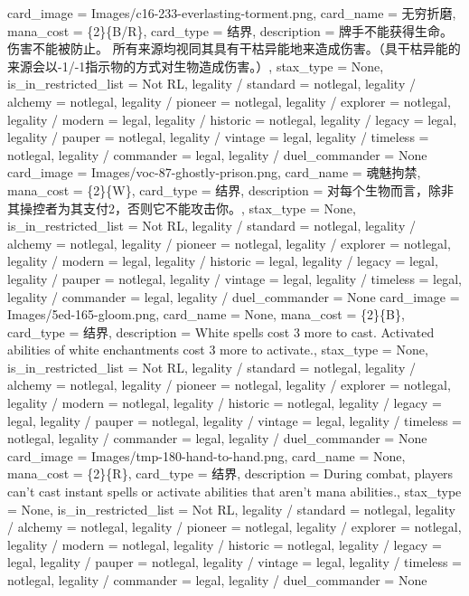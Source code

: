 \documentclass[lang = cn, color = black, 10pt]{AllThatStax}
\begin{document}
\card
{
	card_image = Images/c16-233-everlasting-torment.png,
	card_name = 无穷折磨,
	mana_cost = \{2\}\{B/R\},
	card_type = 结界,
	description = 牌手不能获得生命。
	伤害不能被防止。
	所有来源均视同其具有干枯异能地来造成伤害。（具干枯异能的来源会以-1/-1指示物的方式对生物造成伤害。）,
	stax_type = None,
	is_in_restricted_list = Not RL,
	legality / standard = notlegal,
	legality / alchemy = notlegal,
	legality / pioneer = notlegal,
	legality / explorer = notlegal,
	legality / modern = legal,
	legality / historic = notlegal,
	legality / legacy = legal,
	legality / pauper = notlegal,
	legality / vintage = legal,
	legality / timeless = notlegal,
	legality / commander = legal,
	legality / duel_commander = None
}
\card
{
	card_image = Images/voc-87-ghostly-prison.png,
	card_name = 魂魅拘禁,
	mana_cost = \{2\}\{W\},
	card_type = 结界,
	description = 对每个生物而言，除非其操控者为其支付{2}，否则它不能攻击你。,
	stax_type = None,
	is_in_restricted_list = Not RL,
	legality / standard = notlegal,
	legality / alchemy = notlegal,
	legality / pioneer = notlegal,
	legality / explorer = notlegal,
	legality / modern = legal,
	legality / historic = legal,
	legality / legacy = legal,
	legality / pauper = notlegal,
	legality / vintage = legal,
	legality / timeless = legal,
	legality / commander = legal,
	legality / duel_commander = None
}
\card
{
	card_image = Images/5ed-165-gloom.png,
	card_name = None,
	mana_cost = \{2\}\{B\},
	card_type = 结界,
	description = White spells cost {3} more to cast.
	Activated abilities of white enchantments cost {3} more to activate.,
	stax_type = None,
	is_in_restricted_list = Not RL,
	legality / standard = notlegal,
	legality / alchemy = notlegal,
	legality / pioneer = notlegal,
	legality / explorer = notlegal,
	legality / modern = notlegal,
	legality / historic = notlegal,
	legality / legacy = legal,
	legality / pauper = notlegal,
	legality / vintage = legal,
	legality / timeless = notlegal,
	legality / commander = legal,
	legality / duel_commander = None
}
\card
{
	card_image = Images/tmp-180-hand-to-hand.png,
	card_name = None,
	mana_cost = \{2\}\{R\},
	card_type = 结界,
	description = During combat, players can't cast instant spells or activate abilities that aren't mana abilities.,
	stax_type = None,
	is_in_restricted_list = Not RL,
	legality / standard = notlegal,
	legality / alchemy = notlegal,
	legality / pioneer = notlegal,
	legality / explorer = notlegal,
	legality / modern = notlegal,
	legality / historic = notlegal,
	legality / legacy = legal,
	legality / pauper = notlegal,
	legality / vintage = legal,
	legality / timeless = notlegal,
	legality / commander = legal,
	legality / duel_commander = None
}
\end{document}
